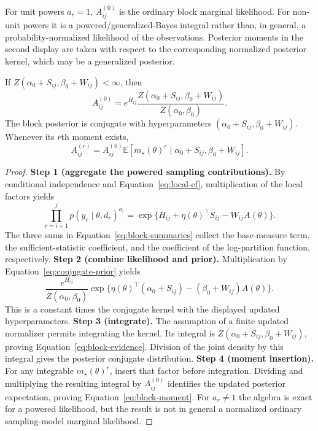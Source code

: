 For unit powers $a_r=1$, $A^{(0)}_{ij}$ is the ordinary block marginal likelihood. For non-unit powers it is a powered/generalized-Bayes integral rather than, in general, a probability-normalized likelihood of the observations. Posterior moments in the second display are taken with respect to the corresponding normalized posterior kernel, which may be a generalized posterior.

\begin{theorem}
\label{thm:block-integration}
If $Z(\alpha_0+S_{ij},\beta_0+W_{ij})<\infty$, then
\begin{equation}
 A^{(0)}_{ij}=e^{H_{ij}}
 \frac{Z(\alpha_0+S_{ij},\beta_0+W_{ij})}{Z(\alpha_0,\beta_0)}.
\label{eq:block-evidence}
\end{equation}
The block posterior is conjugate with hyperparameters
$(\alpha_0+S_{ij},\beta_0+W_{ij})$. Whenever its $r$th moment exists,
\begin{equation}
 A^{(r)}_{ij}=A^{(0)}_{ij}
 \mathbb E[m_\star(\theta)^r\mid\alpha_0+S_{ij},\beta_0+W_{ij}].
\label{eq:block-moment}
\end{equation}
\end{theorem}
\begin{proof}
\textbf{Step 1 (aggregate the powered sampling contributions).}
By conditional independence and Equation~\eqref{eq:local-ef}, multiplication of the local factors yields
\[
\prod_{r=i+1}^{j}p(y_r\mid\theta,d_r)^{a_r}
=\exp\{H_{ij}+\eta(\theta)^\top S_{ij}-W_{ij}A(\theta)\}.
\]
The three sums in Equation~\eqref{eq:block-summaries} collect the base-measure term, the sufficient-statistic coefficient, and the coefficient of the log-partition function, respectively.
\textbf{Step 2 (combine likelihood and prior).}
Multiplication by Equation~\eqref{eq:conjugate-prior} yields
\[
\frac{e^{H_{ij}}}{Z(\alpha_0,\beta_0)}
\exp\!\{\eta(\theta)^\top(\alpha_0+S_{ij})
-(\beta_0+W_{ij})A(\theta)\}.
\]
This is a constant times the conjugate kernel with the displayed updated hyperparameters.
\textbf{Step 3 (integrate).}
The assumption of a finite updated normalizer permits integrating the kernel. Its integral is $Z(\alpha_0+S_{ij},\beta_0+W_{ij})$, proving Equation~\eqref{eq:block-evidence}. Division of the joint density by this integral gives the posterior conjugate distribution.
\textbf{Step 4 (moment insertion).}
For any integrable $m_\star(\theta)^r$, insert that factor before integration. Dividing and multiplying the resulting integral by $A^{(0)}_{ij}$ identifies the updated posterior expectation, proving Equation~\eqref{eq:block-moment}. For $a_r\ne1$ the algebra is exact for a powered likelihood, but the result is not in general a normalized ordinary sampling-model marginal likelihood.
\end{proof}

